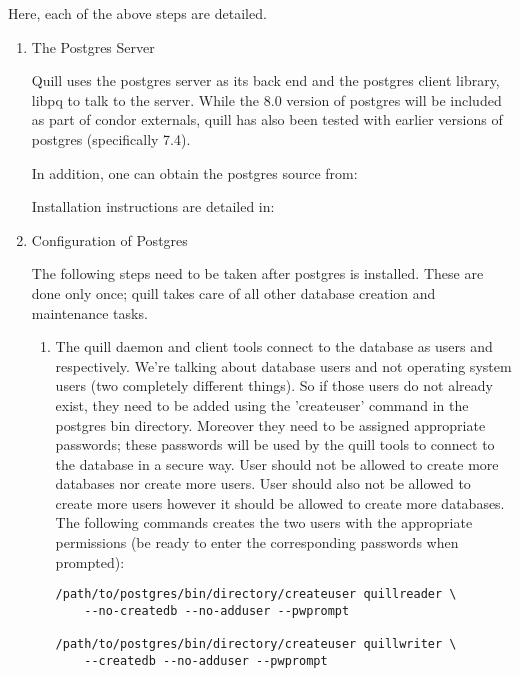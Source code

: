 Here, each of the above steps are detailed.

\begin{enumerate}
\item The Postgres Server

Quill uses the postgres server as its back end and the postgres client
library, libpq to talk to the server. While the 8.0 version of postgres
will be included as part of condor externals, quill has also been tested
with earlier versions of postgres (specifically 7.4).

In addition, one can obtain the postgres source from:


Installation instructions are detailed in:

\item Configuration of Postgres

The following steps need to be taken after postgres is installed.  These
are done only once; quill takes care of all other database creation and
maintenance tasks.

\begin{enumerate}
\item The quill daemon and client tools connect to the database as
users  and  respectively.
We're talking about database users and not operating system users (two
completely different things).  So if those users do not already exist,
they need to be added using the 'createuser' command in the postgres bin
directory.  Moreover they need to be assigned appropriate passwords; these
passwords will be used by the quill tools to connect to the database in a
secure way.  User  should not be allowed to create
more databases nor create more users.  User  should
also not be allowed to create more users however it should be allowed
to create more databases.  The following commands creates the two users
with the appropriate permissions (be ready to enter the corresponding
passwords when prompted):

\begin{verbatim}
/path/to/postgres/bin/directory/createuser quillreader \
	--no-createdb --no-adduser --pwprompt

/path/to/postgres/bin/directory/createuser quillwriter \
	--createdb --no-adduser --pwprompt
\end{verbatim}


\end{enumerate}
\end{enumerate}
